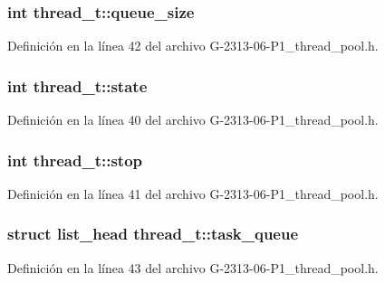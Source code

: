 \hypertarget{structthread__t_aa99eeab6834595bdff5a7da08314fd89}{}
\subsubsection[{queue\+\_\+size}]{\setlength{\rightskip}{0pt plus 5cm}int thread\+\_\+t\+::queue\+\_\+size}\label{structthread__t_aa99eeab6834595bdff5a7da08314fd89}


Definición en la línea 42 del archivo G-\/2313-\/06-\/\+P1\+\_\+thread\+\_\+pool.\+h.

\hypertarget{structthread__t_a3e0780f1c2fc9932258a60b5043fe424}{}
\subsubsection[{state}]{\setlength{\rightskip}{0pt plus 5cm}int thread\+\_\+t\+::state}\label{structthread__t_a3e0780f1c2fc9932258a60b5043fe424}


Definición en la línea 40 del archivo G-\/2313-\/06-\/\+P1\+\_\+thread\+\_\+pool.\+h.

\hypertarget{structthread__t_a8e9f0fd028676d0ebeef8438f2176bb7}{}
\subsubsection[{stop}]{\setlength{\rightskip}{0pt plus 5cm}int thread\+\_\+t\+::stop}\label{structthread__t_a8e9f0fd028676d0ebeef8438f2176bb7}


Definición en la línea 41 del archivo G-\/2313-\/06-\/\+P1\+\_\+thread\+\_\+pool.\+h.

\hypertarget{structthread__t_a69c932ede0de60b66a482fb735fca966}{}
\subsubsection[{task\+\_\+queue}]{\setlength{\rightskip}{0pt plus 5cm}struct {\bf list\+\_\+head} thread\+\_\+t\+::task\+\_\+queue}\label{structthread__t_a69c932ede0de60b66a482fb735fca966}


Definición en la línea 43 del archivo G-\/2313-\/06-\/\+P1\+\_\+thread\+\_\+pool.\+h.


